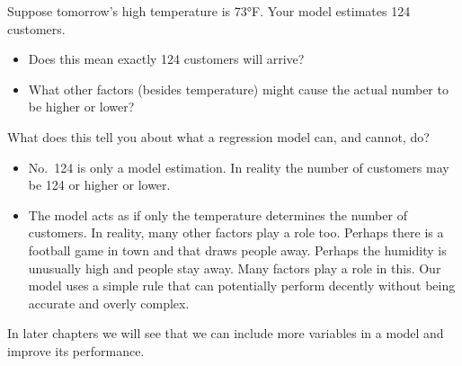 \documentclass[
  12pt,
  letterpaper,
  DIV=11,
  numbers=noendperiod]{scrreprt}
\providecommand{\tightlist}{%
  \setlength{\itemsep}{0pt}\setlength{\parskip}{0pt}}
\begin{document}
\begin{tcolorbox}[enhanced jigsaw, colback=white, leftrule=.75mm, toprule=.15mm, bottomtitle=1mm, breakable, coltitle=black, toptitle=1mm, title=\textcolor{quarto-callout-note-color}{\faInfo}\hspace{0.5em}{Pause \& Think}, opacitybacktitle=0.6, colbacktitle=quarto-callout-note-color!10!white, arc=.35mm, left=2mm, colframe=quarto-callout-note-color-frame, titlerule=0mm, rightrule=.15mm, bottomrule=.15mm, opacityback=0]

Suppose tomorrow's high temperature is 73°F. Your model estimates 124
customers.

\begin{itemize}
\tightlist
\item
  Does this mean exactly 124 customers will arrive?
\item
  What other factors (besides temperature) might cause the actual number
  to be higher or lower?
\end{itemize}

What does this tell you about what a regression model can, and cannot,
do?

\end{tcolorbox}

\begin{tcolorbox}[enhanced jigsaw, colback=white, leftrule=.75mm, toprule=.15mm, bottomtitle=1mm, breakable, coltitle=black, toptitle=1mm, title={Suggested answer}, opacitybacktitle=0.6, colbacktitle=quarto-callout-note-color!10!white, arc=.35mm, left=2mm, colframe=quarto-callout-note-color-frame, titlerule=0mm, rightrule=.15mm, bottomrule=.15mm, opacityback=0]

\begin{itemize}
\item
  No.~124 is only a model estimation. In reality the number of customers
  may be 124 or higher or lower.
\item
  The model acts as if only the temperature determines the number of
  customers. In reality, many other factors play a role too. Perhaps
  there is a football game in town and that draws people away. Perhaps
  the humidity is unusually high and people stay away. Many factors play
  a role in this. Our model uses a simple rule that can potentially
  perform decently without being accurate and overly complex.
\end{itemize}

In later chapters we will see that we can include more variables in a
model and improve its performance.

\end{tcolorbox}
\end{document}
